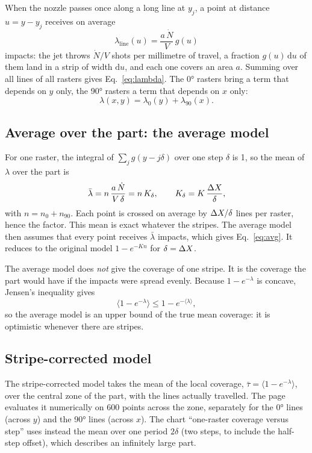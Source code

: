 \documentclass[11pt,a4paper]{article}
\begin{document}
When the nozzle passes once along a long line at $y_j$, a point at distance $u=y-y_j$ receives on average
\begin{equation}
\lambda_{\text{line}}(u)=\frac{a\,\dot N}{V}\,g(u)
\end{equation}
impacts: the jet throws $\dot N/V$ shots per millimetre of travel, a fraction $g(u)\,\mathrm{d}u$ of them land in a strip of width $\mathrm{d}u$, and each one covers an area $a$. Summing over all lines of all rasters gives Eq.~\eqref{eq:lambda}. The 0° rasters bring a term that depends on $y$ only, the 90° rasters a term that depends on $x$ only:
\begin{equation}
\lambda(x,y)=\lambda_0(y)+\lambda_{90}(x).
\end{equation}

\subsection{Average over the part: the average model}

For one raster, the integral of $\sum_j g(y-j\delta)$ over one step $\delta$ is 1, so the mean of $\lambda$ over the part is
\begin{equation}
\bar\lambda=n\,\frac{a\,\dot N}{V\,\delta}=n\,K_\delta,\qquad K_\delta=K\,\frac{\Delta X}{\delta},
\end{equation}
with $n=n_0+n_{90}$. Each point is crossed on average by $\Delta X/\delta$ lines per raster, hence the factor. This mean is exact whatever the stripes. The average model then assumes that every point receives $\bar\lambda$ impacts, which gives Eq.~\eqref{eq:avg}. It reduces to the original model $1-e^{-Kn}$ for $\delta=\Delta X$.

The average model does \emph{not} give the coverage of one stripe. It is the coverage the part would have if the impacts were spread evenly. Because $1-e^{-\lambda}$ is concave, Jensen's inequality gives
\begin{equation}
\bigl\langle 1-e^{-\lambda}\bigr\rangle\le 1-e^{-\langle\lambda\rangle},
\end{equation}
so the average model is an upper bound of the true mean coverage: it is optimistic whenever there are stripes.

\subsection{Stripe-corrected model}

The stripe-corrected model takes the mean of the local coverage, $\bar\tau=\langle 1-e^{-\lambda}\rangle$, over the central zone of the part, with the lines actually travelled. The page evaluates it numerically on 600 points across the zone, separately for the 0° lines (across $y$) and the 90° lines (across $x$). The chart ``one-raster coverage versus step'' uses instead the mean over one period $2\delta$ (two steps, to include the half-step offset), which describes an infinitely large part.
\end{document}
